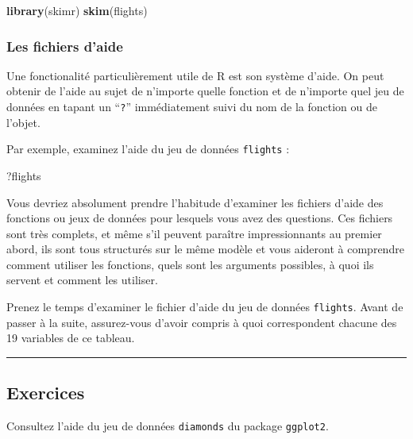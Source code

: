 \documentclass[
  a4paper,
]{article}
\newenvironment{Shaded}{\begin{snugshade}}{\end{snugshade}}
\newcommand{\KeywordTok}[1]{\textcolor[rgb]{0.12,0.11,0.11}{\textbf{#1}}}
\newcommand{\NormalTok}[1]{\textcolor[rgb]{0.12,0.11,0.11}{#1}}
\begin{document}
\begin{Shaded}
\begin{Highlighting}[]
\KeywordTok{library}\NormalTok{(skimr)}
\KeywordTok{skim}\NormalTok{(flights)}
\end{Highlighting}
\end{Shaded}

\hypertarget{les-fichiers-daide}{%
\subsubsection{Les fichiers d'aide}\label{les-fichiers-daide}}

Une fonctionalité particulièrement utile de R est son système d'aide. On peut obtenir de l'aide au sujet de n'importe quelle fonction et de n'importe quel jeu de données en tapant un ``\texttt{?}'' immédiatement suivi du nom de la fonction ou de l'objet.

Par exemple, examinez l'aide du jeu de données \texttt{flights} :

\begin{Shaded}
\begin{Highlighting}[]
\NormalTok{?flights}
\end{Highlighting}
\end{Shaded}

Vous devriez absolument prendre l'habitude d'examiner les fichiers d'aide des fonctions ou jeux de données pour lesquels vous avez des questions. Ces fichiers sont très complets, et même s'il peuvent paraître impressionnants au premier abord, ils sont tous structurés sur le même modèle et vous aideront à comprendre comment utiliser les fonctions, quels sont les arguments possibles, à quoi ils servent et comment les utiliser.

Prenez le temps d'examiner le fichier d'aide du jeu de données \texttt{flights}. Avant de passer à la suite, assurez-vous d'avoir compris à quoi correspondent chacune des 19 variables de ce tableau.

\begin{center}\rule{0.5\linewidth}{0.5pt}\end{center}

\hypertarget{exercices-1}{%
\subsection{Exercices}\label{exercices-1}}

Consultez l'aide du jeu de données \texttt{diamonds} du package \texttt{ggplot2}.
\end{document}
